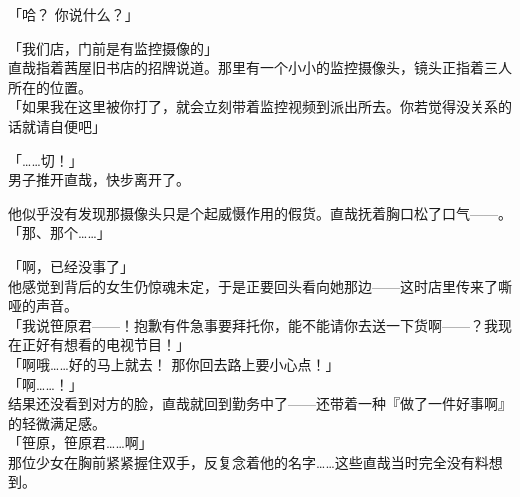 「哈？ 你说什么？」

「我们店，门前是有监控摄像的」\\

直哉指着茜屋旧书店的招牌说道。那里有一个小小的监控摄像头，镜头正指着三人所在的位置。\\

「如果我在这里被你打了，就会立刻带着监控视频到派出所去。你若觉得没关系的话就请自便吧」

「……切！」\\

男子推开直哉，快步离开了。

他似乎没有发现那摄像头只是个起威慑作用的假货。直哉抚着胸口松了口气——。\\

「那、那个……」

「啊，已经没事了」\\

他感觉到背后的女生仍惊魂未定，于是正要回头看向她那边——这时店里传来了嘶哑的声音。\\

「我说笹原君——！抱歉有件急事要拜托你，能不能请你去送一下货啊——？我现在正好有想看的电视节目！」\\

「啊哦……好的马上就去！ 那你回去路上要小心点！」\\

「啊……！」\\

结果还没看到对方的脸，直哉就回到勤务中了——还带着一种『做了一件好事啊』的轻微满足感。\\

「笹原，笹原君……啊」\\

那位少女在胸前紧紧握住双手，反复念着他的名字……这些直哉当时完全没有料想到。\\
